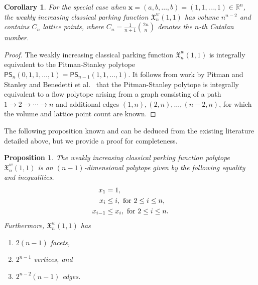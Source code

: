 \documentclass[11pt]{amsart}
\newtheorem{proposition}[theorem]{Proposition}
\newtheorem{corollary}[theorem]{Corollary}
\theoremstyle{definition}
\newcommand{\0}{\emptyset}
\newcommand{\R}{\mathbb{R}}
\newcommand{\bx}{\mathbf{x}}
\newcommand{\X}{\mathfrak{X}}
\begin{document}
\begin{corollary}
For the special case when $\bx=(a,b,\dots,b)=(1,1,\dots,1)\in \R^n$, the weakly increasing classical parking function $\X_{n}^w(1,1)$ has volume $n^{n-2}$ and contains $C_{n}$ lattice points, where $C_n=\displaystyle{\frac{1}{n+1}\binom{2n}{n}}$ denotes the $n$-th Catalan number. 
\end{corollary}

\begin{proof}
The weakly increasing classical parking function $\X^w_n(1,1)$ is integrally equivalent to the Pitman-Stanley polytope $\mathsf{PS}_{n}(0,1,1,\ldots,1) = \mathsf{PS}_{n-1}(1,1,\ldots,1)$. 
It follows from work by Pitman and Stanley \cite{PitmanStanley} and Benedetti et al.~\cite{BGHHKMY} that the Pitman-Stanley polytope is integrally equivalent to a flow polytope arising from a graph consisting of a path $1\rightarrow 2 \rightarrow \cdots \rightarrow n$ and additional edges $(1,n),(2,n),\dots, (n-2,n)$, for which the volume and lattice point count are known.
\end{proof}

The following proposition known and can be deduced from the existing literature detailed above, but we provide a proof for completeness.

\begin{proposition}
The weakly increasing classical parking function polytope $\X^w_n(1,1)$ is an $(n-1)$-dimensional polytope given by the following equality and inequalities.
\begin{align*}
    x_1  &= 1,\\
    x_i &\leq i, \text{ \emph{for} } 2\leq i\leq n,\\
    x_{i-1} &\leq x_i,  \text{ \emph{for} }2\leq i\leq n.
\end{align*}
Furthermore, $\X_n^w(1,1)$ has
\begin{enumerate}
    \item $2(n-1)$ facets,
    \item $2^{n-1}$ vertices, and 
    \item $2^{n-2}(n-1)$ edges.
\end{enumerate}
\end{proposition}
\end{document}
